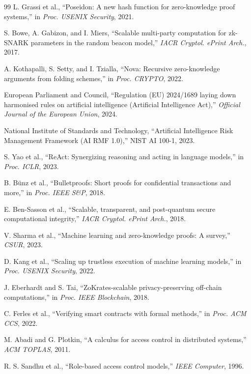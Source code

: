 \documentclass[10pt,conference]{IEEEtran}
\begin{document}
\begin{thebibliography}{99}
L. Grassi et al., ``Poseidon: A new hash function for zero-knowledge proof systems,'' in \textit{Proc. USENIX Security}, 2021.

S. Bowe, A. Gabizon, and I. Miers, ``Scalable multi-party computation for zk-SNARK parameters in the random beacon model,'' \textit{IACR Cryptol. ePrint Arch.}, 2017.

A. Kothapalli, S. Setty, and I. Tzialla, ``Nova: Recursive zero-knowledge arguments from folding schemes,'' in \textit{Proc. CRYPTO}, 2022.

European Parliament and Council, ``Regulation (EU) 2024/1689 laying down harmonised rules on artificial intelligence (Artificial Intelligence Act),'' \textit{Official Journal of the European Union}, 2024.

National Institute of Standards and Technology, ``Artificial Intelligence Risk Management Framework (AI RMF 1.0),'' NIST AI 100-1, 2023.

S. Yao et al., ``ReAct: Synergizing reasoning and acting in language models,'' in \textit{Proc. ICLR}, 2023.

B. B\"unz et al., ``Bulletproofs: Short proofs for confidential transactions and more,'' in \textit{Proc. IEEE S\&P}, 2018.

E. Ben-Sasson et al., ``Scalable, transparent, and post-quantum secure computational integrity,'' \textit{IACR Cryptol. ePrint Arch.}, 2018.

V. Sharma et al., ``Machine learning and zero-knowledge proofs: A survey,'' \textit{CSUR}, 2023.

D. Kang et al., ``Scaling up trustless execution of machine learning models,'' in \textit{Proc. USENIX Security}, 2022.

J. Eberhardt and S. Tai, ``ZoKrates-scalable privacy-preserving off-chain computations,'' in \textit{Proc. IEEE Blockchain}, 2018.

C. Ferles et al., ``Verifying smart contracts with formal methods,'' in \textit{Proc. ACM CCS}, 2022.

M. Abadi and G. Plotkin, ``A calculus for access control in distributed systems,'' \textit{ACM TOPLAS}, 2011.

R. S. Sandhu et al., ``Role-based access control models,'' \textit{IEEE Computer}, 1996.


\end{thebibliography}
\end{document}
